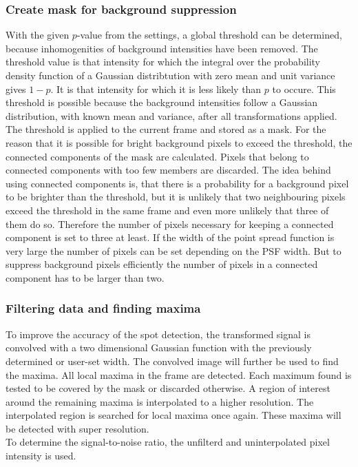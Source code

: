 \subsubsection{Create mask for background suppression}
With the given $p$-value from the settings, a global threshold can be determined, because inhomogenities of background intensities have been removed. The threshold value is that intensity 
for which the integral over the probability density function of a Gaussian distribtution with zero mean and unit variance gives $1-p$. It is that intensity for which it is less likely than $p$ to occure. This threshold is possible because the background intensities follow a Gaussian distribution, with known mean and variance, after all transformations applied.\newline
The threshold is applied to the current frame and stored as a mask. For the reason that it is possible for bright background pixels to exceed the threshold, the connected components of the mask are calculated. Pixels that belong to connected components with too few members are discarded. The idea behind using connected components is, that there is a probability for a background pixel to be brighter than the threshold, but it is unlikely that two neighbouring pixels exceed the threshold in the same frame and even more unlikely that three of them do so. Therefore the number of pixels necessary for keeping a connected component is set to three at least. If the width of the point spread function is very large the number of pixels can be set depending on the PSF width. But to suppress background pixels efficiently the number of pixels in a connected component has to be larger than two.
\subsubsection{Filtering data and finding maxima}
To improve the accuracy of the spot detection, the transformed signal is convolved with a two dimensional Gaussian function with the previously determined or user-set width. The convolved image will further be used to find the maxima. All local maxima in the frame are detected. Each maximum found is tested to be covered by the mask or discarded otherwise. A region of interest around the remaining maxima is interpolated to a higher resolution. The interpolated region is searched for local maxima once again. These maxima will be detected with super resolution.\\
To determine the signal-to-noise ratio, the unfilterd and uninterpolated pixel intensity is used.

